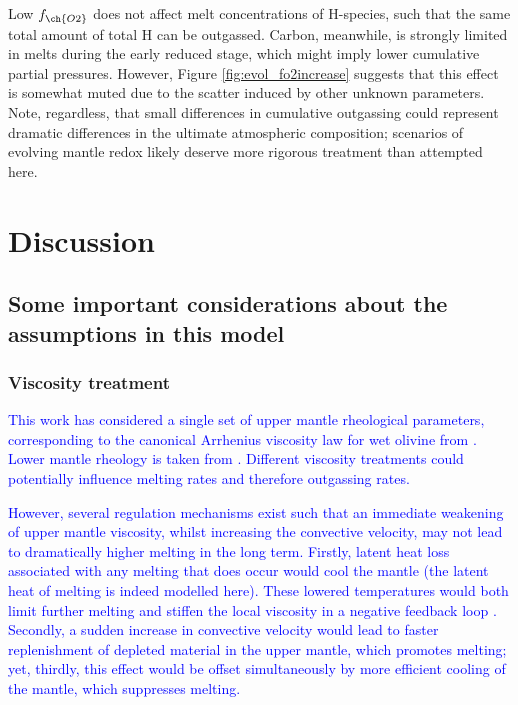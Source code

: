 \documentclass[3p,authoryear]{elsarticle}
\newcommand{\editthree}[2]{\textcolor{blue}{\sout{#1}#2}}
\begin{document}
Low $f_{\ch{O2}}$ does not affect melt concentrations of H-species, such that the same total amount of total H can be outgassed. Carbon, meanwhile, is strongly limited in melts during the early reduced stage, which might imply lower cumulative partial pressures. However, Figure \ref{fig:evol_fo2increase} suggests that this effect is somewhat muted due to the scatter induced by other unknown parameters. Note, regardless, that small differences in cumulative outgassing could represent dramatic differences in the ultimate atmospheric composition; scenarios of evolving mantle redox likely deserve more rigorous treatment than attempted here.





\section{Discussion}

\subsection{Some important considerations about the assumptions in this model}

\subsubsection{Viscosity treatment}

\editthree{}{This work has considered a single set of upper mantle rheological parameters, corresponding to the canonical Arrhenius viscosity law for wet olivine from \citet{Karato1993}. Lower mantle rheology is taken from \citet{Tackley2013}.  Different viscosity treatments could potentially influence melting rates and therefore outgassing rates.} 

\editthree{}{However, several regulation mechanisms exist such that an immediate weakening of upper mantle viscosity, whilst increasing the convective velocity, may not lead to dramatically higher melting in the long term. Firstly, latent heat loss associated with any melting that does occur would cool the mantle (the latent heat of melting is indeed modelled here). These lowered temperatures would both limit further melting and stiffen the local viscosity in a negative feedback loop \citep{Ogawa2011}. Secondly, a sudden increase in convective velocity would lead to faster replenishment of depleted material in the upper mantle, which promotes melting; yet, thirdly, this effect would be offset simultaneously by more efficient cooling of the mantle, which suppresses melting.}
\end{document}

